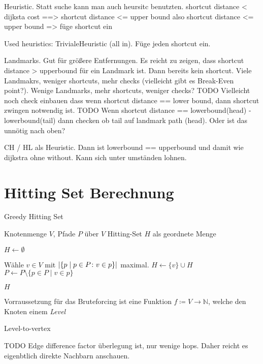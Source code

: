 Heuristic.
Statt suche kann man auch heursitc benutzten.
shortcut distance < dijksta cost ==> shortcut distance <= upper bound
also shortcut distance <= upper bound => füge shortcut ein

Used heuristics:
TrivialeHeuristic (all in). Füge jeden shortcut ein.

Landmarks. Gut für größere Entfernungen.
Es reicht zu zeigen, dass shortcut distance > upperbound für ein Landmark ist. Dann bereits kein shortcut.
Viele Landmakrs, weniger shortcuts, mehr checks (vielleicht gibt es Break-Even point?). Wenige Landmarks, mehr shortcuts, weniger checks?
TODO Vielleicht noch check einbauen dass wenn shortcut distance == lower bound, dann shortcut zwingen notwendig ist.
TODO Wenn shortcut distance == lowerbound(head) - lowerbound(tail) dann checken ob tail auf landmark path (head). Oder ist das unnötig nach oben?

CH / HL als Heuristic.
Dann ist lowerbound == upperbound und damit wie dijkstra ohne without. Kann sich unter umständen lohnen.


\section{Hitting Set Berechnung}

\begin{algorithm}
    \caption{Greedy Hitting Set}
    \begin{algorithmic}[1]
        \Require Knotenmenge $V$, Pfade $P$ über $V$
        \Ensure Hitting-Set $H$ als geordnete Menge

        \State $H \gets \emptyset$

        \State

        \State Wähle $v \in V$ mit $\abs{ \{ p \mid p \in P \colon v \in p \}}$ maximal.
        \State $H \gets \{v\} \cup H$
        \State $P \gets P \setminus \{p \in P \mid v \in p\}$
        \EndWhile

        \State

        \State \Return $H$
    \end{algorithmic}
\end{algorithm}

Vorraussetzung für das Bruteforcing ist eine Funktion $f \coloneq V \to \mathbb{N}$, welche den Knoten einem \emph{Level}

Level-to-vertex

TODO Edge difference factor
überlegung ist, nur wenige hops. Daher reicht es eigenbtlich direkte Nachbarn anschauen.

